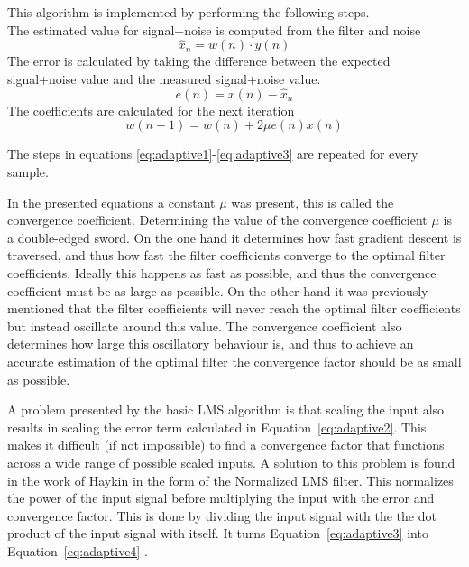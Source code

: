 This algorithm is implemented by performing the following steps. \\
The estimated value for signal+noise is computed from the filter and noise
\begin{equation}\label{eq:adaptive1}
    \hat{x}_n = w(n)\cdot y(n)
\end{equation}
The error is calculated by taking the difference between the expected signal+noise value and the measured signal+noise value.
\begin{equation}\label{eq:adaptive2}
    e(n) = x(n) - \hat{x}_n
\end{equation}
The coefficients are calculated for the next iteration
\begin{equation}\label{eq:adaptive3}
    w(n+1) = w(n) + 2 \mu e(n) x(n)
\end{equation}

The steps in equations \ref{eq:adaptive1}-\ref{eq:adaptive3} are repeated for every sample.

In the presented equations a constant $\mu$ was present, this is called the convergence coefficient. Determining the value of the convergence coefficient $\mu$ is a double-edged sword. On the one hand it determines how fast gradient descent is traversed, and thus how fast the filter coefficients converge to the optimal filter coefficients. Ideally this happens as fast as possible, and thus the convergence coefficient must be as large as possible. On the other hand it was previously mentioned that the filter coefficients will never reach the optimal filter coefficients but instead oscillate around this value. The convergence coefficient also determines how large this oscillatory behaviour is, and thus to achieve an accurate estimation of the optimal filter the convergence factor should be as small as possible. 

A problem presented by the basic LMS algorithm is that scaling the input also results in scaling the error term calculated in Equation~\ref{eq:adaptive2}. This makes it difficult (if not impossible) to find a convergence factor that functions across a wide range of possible scaled inputs. A solution to this problem is found in the work of Haykin \cite{adaptive_filter_theory} in the form of the Normalized LMS filter. This normalizes the power of the input signal before multiplying the input with the error and convergence factor. This is done by dividing the input signal with the the dot product of the input signal with itself. It turns Equation~\ref{eq:adaptive3} into Equation~\ref{eq:adaptive4} \cite{adaptive_filter_theory}.

